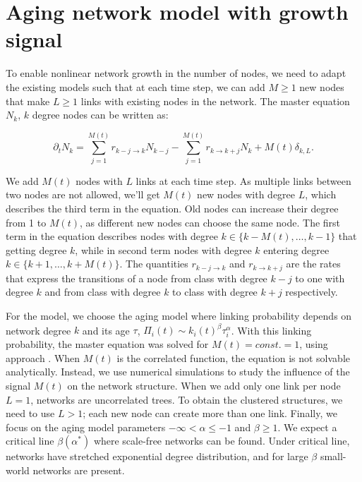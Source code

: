 \section{Aging network model with growth signal}

To enable nonlinear network growth in the number of nodes, we need to adapt the existing models such that at each time step, we can add $M\geq1$ new nodes that make $L\geq1$ links with existing nodes in the network. The master equation $N_k$, $k$ degree nodes can be written as: 

\begin{equation}
\partial_{t}N_{k}=\sum^{M(t)}_{j=1}r_{k-j\longrightarrow k}N_{k-j}-\sum^{M(t)}_{j=1}r_{k\longrightarrow k+j}N_{k}+M(t)\delta_{k,L} . \label{eq:aging_master}  
\end{equation}

We add $M(t)$ nodes with $L$ links at each time step. As multiple links between two nodes are not allowed, we'll get $M(t)$ new nodes with degree $L$, which describes the third term in the equation. Old nodes can increase their degree from 1 to $M(t)$, as different new nodes can choose the same node. The first term in the equation describes nodes with degree $k\in\{k-M(t),\ldots, k-1\}$ that getting degree $k$, while in second term nodes with degree $k$ entering degree  $k\in\{k+1,\ldots, k+M(t)\}$. The quantities $r_{k-j\longrightarrow k}$ and $r_{k\longrightarrow k+j}$ are the rates that express the transitions of a node from class with degree $k-j$ to one with degree $k$ and from class with degree $k$ to class with degree $k+j$ respectively.  

For the model, we choose the aging model where linking probability depends on network degree $k$ and its age $\tau$, $\Pi_{i}(t)\sim k_{i}(t)^{\beta}\tau_{i}^{\alpha}$. With this linking probability, the master equation was solved for $M(t)=const.=1$, using approach \cite{dorogovtsev2001b}. When $M(t)$ is the correlated function, the equation is not solvable analytically. Instead, we use numerical simulations to study the influence of the signal $M(t)$ on the network structure. When we add only one link per node $L=1$, networks are uncorrelated trees. To obtain the clustered structures, we need to use $L>1$; each new node can create more than one link. Finally, we focus on the aging model parameters $-\infty<\alpha\leq-1$ and $\beta\geq1$. We expect a critical line $\beta(\alpha^{*})$ where scale-free networks can be found. Under critical line, networks have stretched exponential degree distribution, and for large $\beta$ small-world networks are present. 

